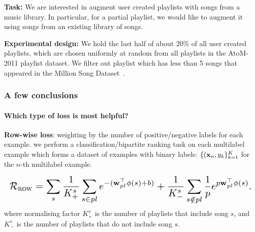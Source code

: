 {\bf Task:}
We are interested in augment user created playlists with songs from a music library.
In particular, for a partial playlist, we would like to augment it using songs from an existing library of songs.

{\bf Experimental design:}
We hold the last half of about 20\% of all user created playlists, 
which are chosen uniformly at random from all playlists in the AtoM-2011 playlist dataset.
We filter out playlist which has less than 5 songs that appeared in the Million Song Dataset~\cite{}.


\subsubsection{A few conclusions}
\begin{table}[!h]
\centering
\caption{Statistics of dataset}
\end{table}


\paragraph{Which type of loss is most helpful?}

{\bf Row-wise loss}: weighting by the number of positive/negative labels for each example.
\ie we perform a classification/bipartite ranking task on each multilabel example 
which forms a dataset of examples with binary labels: $\{(\mathbf{x}_n, y_k\}_{k=1}^K$ for the $n$-th multilabel example.

\begin{equation*}
\resizebox{\linewidth}{!}{$
\RCal_\textsc{row} 
= \displaystyle \sum_s 
  \frac{1}{K_+^s} \sum_{s \in pl} e^{-(\w_{pl}^\top \phi(s) + b)} +
  \frac{1}{K_-^s} \sum_{s \notin pl} \frac{1}{p} e^{p \w_{pl}^\top \phi(s)}.
$}
\end{equation*}
where normalising factor $K_+^s$ is the number of playlists that include song $s$,
and $K_-^s$ is the number of playlists that do not include song $s$.


